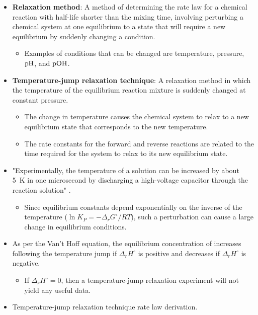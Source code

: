 \documentclass[../notes.tex]{subfiles}
\begin{document}
\begin{itemize}
    \item \textbf{Relaxation method}: A method of determining the rate law for a chemical reaction with half-life shorter than the mixing time, involving perturbing a chemical system at one equilibrium to a state that will require a new equilibrium by suddenly changing a condition.
    \begin{itemize}
        \item Examples of conditions that can be changed are temperature, pressure, $\text{pH}$, and $\text{pOH}$.
    \end{itemize}
    \item \textbf{Temperature-jump relaxation technique}: A relaxation method in which the temperature of the equilibrium reaction mixture is suddenly changed at constant pressure.
    \begin{itemize}
        \item The change in temperature causes the chemical system to relax to a new equilibrium state that corresponds to the new temperature.
        \item The rate constants for the forward and reverse reactions are related to the time required for the system to relax to its new equilibrium state.
    \end{itemize}
    \item "Experimentally, the temperature of a solution can be increased by about \SI{5}{\kelvin} in one microsecond by discharging a high-voltage capacitor through the reaction solution" \parencite[1067]{bib:McQuarrieSimon}.
    \begin{itemize}
        \item Since equilibrium constants depend exponentially on the inverse of the temperature ($\ln K_P=-\Delta_rG^\circ/RT$), such a perturbation can cause a large change in equilibrium conditions.
    \end{itemize}
    \item As per the Van't Hoff equation, the equilibrium concentration of  increases following the temperature jump if $\Delta_rH^\circ$ is positive and decreases if $\Delta_rH^\circ$ is negative.
    \begin{itemize}
        \item If $\Delta_rH^\circ=0$, then a temperature-jump relaxation experiment will not yield any useful data.
    \end{itemize}
    \item Temperature-jump relaxation technique rate law derivation.
    \begin{itemize}

\end{itemize}
\end{itemize}
\end{document}
